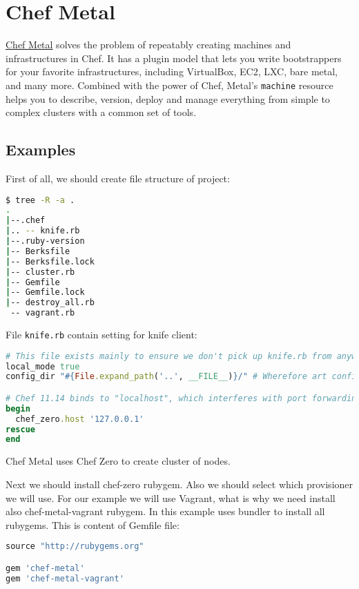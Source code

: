 \section{Chef Metal}
\label{sec:tat-chef-metal}

\href{https://github.com/opscode/chef-metal}{Chef Metal} solves the problem of repeatably creating machines and infrastructures in Chef. It has a plugin model that lets you write bootstrappers for your favorite infrastructures, including VirtualBox, EC2, LXC, bare metal, and many more. Combined with the power of Chef, Metal's \lstinline!machine! resource helps you to describe, version, deploy and manage everything from simple to complex clusters with a common set of tools.

\subsection{Examples}

First of all, we should create file structure of project:

\begin{lstlisting}[language=Bash,label=lst:tat-chef-metal1]
$ tree -R -a .
.
|--.chef
|.. -- knife.rb
|--.ruby-version
|-- Berksfile
|-- Berksfile.lock
|-- cluster.rb
|-- Gemfile
|-- Gemfile.lock
|-- destroy_all.rb
 -- vagrant.rb
\end{lstlisting}

File \lstinline!knife.rb! contain setting for knife client:

\begin{lstlisting}[language=Ruby,label=lst:tat-chef-metal2]
# This file exists mainly to ensure we don't pick up knife.rb from anywhere else
local_mode true
config_dir "#{File.expand_path('..', __FILE__)}/" # Wherefore art config_dir, chef?

# Chef 11.14 binds to "localhost", which interferes with port forwarding on IPv6 machines for some reason
begin
  chef_zero.host '127.0.0.1'
rescue
end
\end{lstlisting}

Chef Metal uses Chef Zero to create cluster of nodes.

Next we should install chef-zero rubygem. Also we should select which provisioner we will use. For our example we will use Vagrant, what is why we need install also chef-metal-vagrant rubygem. In this example uses bundler to install all rubygems. This is content of Gemfile file:

\begin{lstlisting}[language=Ruby,label=lst:tat-chef-metal3]
source "http://rubygems.org"

gem 'chef-metal'
gem 'chef-metal-vagrant'
\end{lstlisting}

